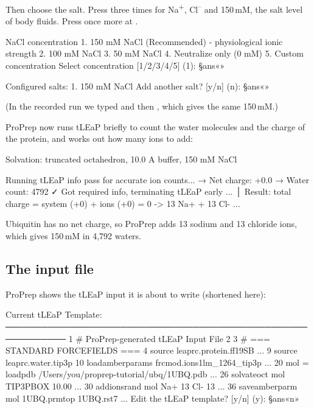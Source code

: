 Then choose the salt. Press  three times for Na\textsuperscript{+},
Cl\textsuperscript{--} and 150\,mM, the salt level of body fluids. Press
 once more at .

\begin{screen}
NaCl concentration
  1. 150 mM NaCl (Recommended) - physiological ionic strength
  2. 100 mM NaCl
  3. 50 mM NaCl
  4. Neutralize only (0 mM)
  5. Custom concentration
Select concentration [1/2/3/4/5] (1): §ans«»

Configured salts:
  1. 150 mM NaCl
Add another salt? [y/n] (n): §ans«»
\end{screen}

(In the recorded run we typed  and then , which gives the
same 150\,mM.)

ProPrep now runs tLEaP briefly to count the water molecules and the charge of
the protein, and works out how many ions to add:

\begin{screen}
Solvation: truncated octahedron, 10.0 A buffer, 150 mM NaCl

Running tLEaP info pass for accurate ion counts...
  → Net charge: +0.0
  → Water count: 4792
  ✓ Got required info, terminating tLEaP early
...
│  Result: total charge = system (+0) + ions (+0) = 0  ->  13 Na+ + 13 Cl-
...
\end{screen}

Ubiquitin has no net charge, so ProPrep adds 13 sodium and 13 chloride ions,
which gives 150\,mM in 4,792 waters.

\subsection{The input file}

ProPrep shows the tLEaP input it is about to write (shortened here):

\begin{screen}
Current tLEaP Template:
────────────────────────────────────────────────────────────
   1 # ProPrep-generated tLEaP Input File
   2
   3 # === STANDARD FORCEFIELDS ===
   4 source leaprc.protein.ff19SB
...
   9 source leaprc.water.tip3p
  10 loadamberparams frcmod.ions1lm_1264_tip3p
...
  20 mol = loadpdb /Users/you/proprep-tutorial/ubq/1UBQ.pdb
...
  26 solvateoct mol TIP3PBOX 10.00
...
  30 addionsrand mol Na+ 13 Cl- 13
...
  36 saveamberparm mol 1UBQ.prmtop 1UBQ.rst7
...
Edit the tLEaP template? [y/n] (y): §ans«n»
\end{screen}

